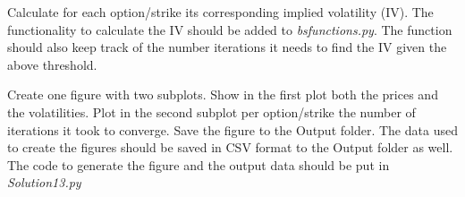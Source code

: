 \documentclass{article}
\begin{document}
Calculate for each option/strike its corresponding implied volatility (IV). 
The functionality to calculate the IV should be added to \textit{bsfunctions.py}. 
The function should also keep track of the number iterations it needs to find the IV given the above threshold.

\begin{warn}[Deliverable 04:]
  Create one figure with two subplots. Show in the first plot both the prices and the volatilities. 
  Plot in the second subplot per option/strike the number of iterations it took to converge. 
  Save the figure to the Output folder. 
  The data used to create the figures should be saved in CSV format to the Output folder as well. 
  The code to generate the figure and the output data should be put in \textit{Solution13.py}
\end{warn}

%
	


\end{document}

